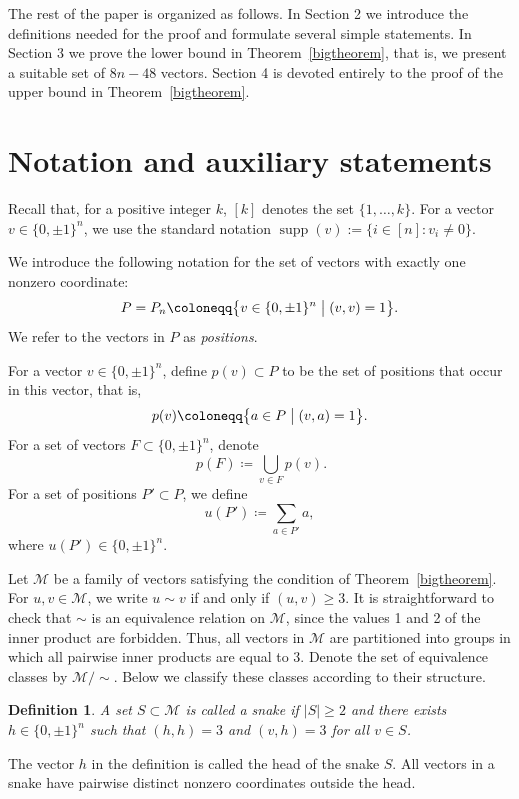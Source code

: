 \documentclass[12pt,a4paper]{article}
\newcommand{\M}{\mathcal{M}}
\DeclareMathOperator{\supp}{supp}
\newtheorem{definition}{Definition}
\begin{document}

The rest of the paper is organized as follows. In Section 2 we introduce the definitions needed for the proof and formulate several simple statements. In Section 3 we prove the lower bound in Theorem~\ref{bigtheorem}, that is, we present a suitable set of $8n-48$ vectors. Section 4 is devoted entirely to the proof of the upper bound in Theorem~\ref{bigtheorem}.

\section{Notation and auxiliary statements}\label{sec2}

Recall that, for a positive integer $k$, $[k]$ denotes the set $\{1,\ldots,k\}$. For a vector \(v\in\{0,\pm1\}^n\), we use the standard notation $\supp(v):=\{i\in[n]:v_i\ne0\}$.

We introduce the following notation for the set of vectors with exactly one nonzero coordinate:
$$ P = P_n \coloneqq \bigl\{v \in \{0, \pm 1\}^n \bigm| (v, v) = 1 \bigr\}. $$
We refer to the vectors in $P$ as \textit{positions}.

For a vector $v \in \{0,\pm1\}^n$, define $p(v) \subset P$ to be the set of positions that occur in this vector, that is,
$$p(v) \coloneqq \bigl\{a \in P \bigm| (v, a) = 1 \bigr\}.$$
For a set of vectors $F \subset \{0,\pm 1\}^n$, denote
$$\ p(F) \coloneqq \bigcup_{v \in F}p(v).$$
For a set of positions $P' \subset P$, we define
$$u(P') \coloneqq \sum_{a \in P'} a,$$
where $u(P') \in \{0,\pm1\}^n$.

Let $\M$ be a family of vectors satisfying the condition of Theorem~\ref{bigtheorem}. For $u,v \in \M$, we write $u \sim v$ if and only if $(u,v) \geqslant 3$. It is straightforward to check that $\sim$ is an equivalence relation on $\M$, since the values 1 and 2 of the inner product are forbidden. Thus, all vectors in $\M$ are partitioned into groups in which all pairwise inner products are equal to 3. Denote the set of equivalence classes by $\M/\sim$. Below we classify these classes according to their structure.

\begin{definition}
    A set $S \subset \M$ is called a snake if $|S| \geqslant 2$ and there exists $h \in \{0,\pm 1\}^n$ such that
    $(h, h) = 3$ and $(v, h) = 3$ for all $v \in S$.
\end{definition}
The vector $h$ in the definition is called the head of the snake $S$. All vectors in a snake have pairwise distinct nonzero coordinates outside the head.
\end{document}
